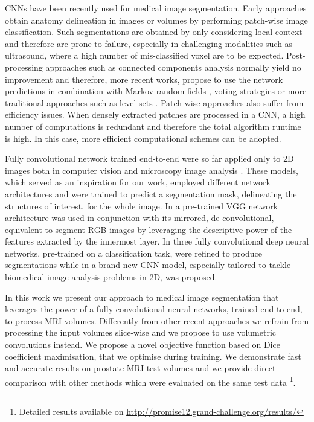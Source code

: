 \documentclass{llncs}
\begin{document}
CNNs have been recently used for medical image segmentation. 
Early approaches obtain anatomy delineation in images or volumes by performing patch-wise image classification. Such segmentations are obtained by only considering local context and therefore are prone to failure, especially in challenging modalities such as ultrasound, where a high number of mis-classified voxel are to be expected.
Post-processing approaches such as connected components analysis normally yield no improvement and therefore, more recent works, propose to use the network predictions in combination with Markov random fields  \cite{kamnitsas2016efficient}, voting strategies \cite{milletari2016hough} or more traditional approaches such as level-sets  \cite{cha2016urinary}. 
Patch-wise approaches also suffer from efficiency issues. When densely extracted patches are processed in a CNN, a high number of computations is redundant and therefore the total algorithm runtime is high. In this case, more efficient computational schemes can be adopted.

Fully convolutional network trained end-to-end were so far applied only to 2D images both in computer vision \cite{noh2015learning,long2015fully} and microscopy image analysis \cite{ronneberger2015u}. These models, which served as an inspiration for our work, employed different network architectures and were trained to predict a segmentation mask, delineating the structures of interest, for the whole image. In \cite{noh2015learning} a pre-trained VGG network architecture \cite{simonyan2014very} was used in conjunction with its mirrored, de-convolutional, equivalent to segment RGB images by leveraging the descriptive power of the features extracted by the innermost layer. In \cite{long2015fully} three fully convolutional deep neural networks, pre-trained on a classification task, were refined to produce segmentations while in \cite{ronneberger2015u} a brand new CNN model, especially tailored to tackle biomedical image analysis problems in 2D, was proposed.

In this work we present our approach to medical image segmentation that leverages the power of a fully convolutional neural networks, trained end-to-end, to process MRI volumes. 
Differently from other recent approaches we refrain from processing the input volumes slice-wise and we propose to use volumetric convolutions instead. We propose a novel objective function based on Dice coefficient maximisation, that we optimise during training.
We demonstrate fast and accurate results on prostate MRI test volumes and we provide direct comparison with other methods which were evaluated on the same test data \footnote{Detailed results available on \url{http://promise12.grand-challenge.org/results/}}. 
%
 
\end{document}
